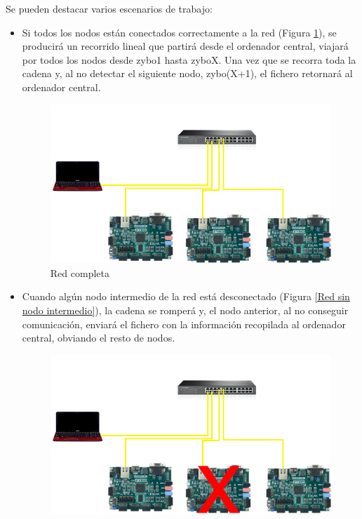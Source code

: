 Se pueden destacar varios escenarios de trabajo:
\begin{itemize}
	\item Si todos los nodos están conectados correctamente a la red (Figura \ref{Red completa}), se producirá un recorrido lineal que partirá desde el ordenador central, viajará por todos los nodos desde zybo1 hasta zyboX. Una vez que se recorra toda la cadena y, al no detectar el siguiente nodo, zybo(X+1), el fichero retornará al ordenador central.
	\begin{figure}[h]
		\centering
		\includegraphics[scale=0.5]{Epilogo/RedCompleta.png}
		\caption{Red completa}
		\label{Red completa}
	\end{figure}
\newpage
	\item Cuando algún nodo intermedio de la red está desconectado (Figura \ref{Red sin nodo intermedio}), la cadena se romperá y, el nodo anterior, al no conseguir comunicación, enviará el fichero con la información recopilada al ordenador central, obviando el resto de nodos.
	\begin{figure}[h]
		\centering
		\includegraphics[scale=0.5]{Epilogo/RedSinNodo2.png}

\end{figure}
\end{itemize}
